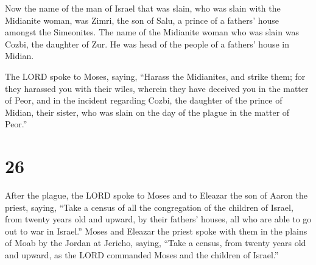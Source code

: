  Now the name of the man of Israel that was slain, who was
slain with the Midianite woman, was Zimri, the son of Salu, a prince of
a fathers' house amongst the Simeonites.  The name of the
Midianite woman who was slain was Cozbi, the daughter of Zur. He was
head of the people of a fathers' house in Midian.

 The LORD spoke to Moses, saying,  ``Harass
the Midianites, and strike them;  for they harassed you
with their wiles, wherein they have deceived you in the matter of Peor,
and in the incident regarding Cozbi, the daughter of the prince of
Midian, their sister, who was slain on the day of the plague in the
matter of Peor.''

\hypertarget{section-25}{%
\section{26}\label{section-25}}

 After the plague, the LORD spoke to Moses and to Eleazar
the son of Aaron the priest, saying,  ``Take a census of all
the congregation of the children of Israel, from twenty years old and
upward, by their fathers' houses, all who are able to go out to war in
Israel.''  Moses and Eleazar the priest spoke with them in
the plains of Moab by the Jordan at Jericho, saying,  ``Take
a census, from twenty years old and upward, as the LORD commanded Moses
and the children of Israel.''

